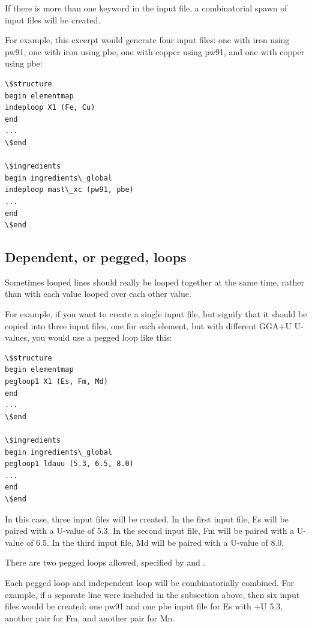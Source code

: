 \documentclass[letterpaper,10pt,english]{sphinxmanual}
\begin{document}
If there is more than one  keyword in the input file, a combinatorial spawn of input files will be created.

For example, this excerpt would generate four input files: one with iron using pw91, one with iron using pbe, one with copper using pw91, and one with copper using pbe:

\begin{Verbatim}[commandchars=\\\{\}]
\$structure
begin elementmap
indeploop X1 (Fe, Cu)
end
...
\$end

\$ingredients
begin ingredients\_global
indeploop mast\_xc (pw91, pbe)
...
end
\$end
\end{Verbatim}


\subsection{Dependent, or pegged, loops}
\label{3_0_inputfile:dependent-or-pegged-loops}
Sometimes looped lines should really be looped together at the same time, rather than with each value looped over each other value.

For example, if you want to create a single input file, but signify that it should be copied into three input files, one for each element, but with different GGA+U U-values, you would use a pegged loop like this:

\begin{Verbatim}[commandchars=\\\{\}]
\$structure
begin elementmap
pegloop1 X1 (Es, Fm, Md)
end
...
\$end

\$ingredients
begin ingredients\_global
pegloop1 ldauu (5.3, 6.5, 8.0)
...
end
\$end
\end{Verbatim}

In this case, three input files will be created. In the first input file, Es will be paired with a U-value of 5.3. In the second input file, Fm will be paired with a U-value of 6.5. In the third input file, Md will be paired with a U-value of 8.0.

There are two pegged loops allowed, specified by  and .

Each pegged loop and independent loop will be combinatorially combined. For example, if a separate line  were included in the  subsection above, then six input files would be created: one pw91 and one pbe input file for Es with +U 5.3, another pair for Fm, and another pair for Mn.
\end{document}
